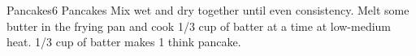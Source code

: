 \documentclass[../main.tex]{subfiles}
\begin{document}
\begin{recipe}{Pancakes}{6 Pancakes}{}
    Mix wet and dry together until even consistency.
    Melt some butter in the frying pan and cook 1/3
    cup of batter at a time at low-medium heat. 1/3
    cup of batter makes 1 think pancake.
    
\end{recipe}
\end{document}
